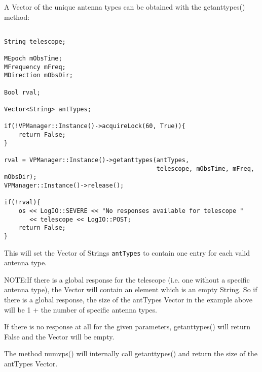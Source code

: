 \documentclass[12pt]{article}
\begin{document}
\newpage

A Vector of the unique antenna types can be obtained with the getanttypes() method:
{\small
\begin{verbatim}

String telescope; 

MEpoch mObsTime;
MFrequency mFreq;
MDirection mObsDir;

Bool rval;

Vector<String> antTypes;

if(!VPManager::Instance()->acquireLock(60, True)){ 
    return False;
}

rval = VPManager::Instance()->getanttypes(antTypes, 
                                          telescope, mObsTime, mFreq, mObsDir);
VPManager::Instance()->release();

if(!rval){
    os << LogIO::SEVERE << "No responses available for telescope "
       << telescope << LogIO::POST;
    return False;
}

\end{verbatim}
}
This will set the Vector of Strings {\tt antTypes} to contain one entry
for each valid antenna type. 

NOTE:If there is a global response for the telescope (i.e. one without a specific antenna type),
the Vector will contain an element which is an empty String.
So if there is a global response, the size of the antTypes Vector in the example above 
will be 1 + the number of specific antenna types. 

If there is no response at all for the given parameters, getanttypes() will return False
and the Vector will be empty.

The method numvps() will internally call getanttypes() and return the size of the
antTypes Vector.
\end{document}
